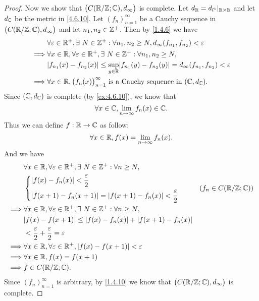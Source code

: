 \begin{proof}
  Now we show that \(\big(C(\mathbb{R} / \mathbb{Z} ; \mathbb{C}), d_\infty\big)\) is complete.
  Let \(d_{\mathbb{R}} = d_{l^1}|_{\mathbb{R} \times \mathbb{R}}\) and let \(d_{\mathbb{C}}\) be the metric in \cref{4.6.10}.
  Let \((f_n)_{n = 1}^\infty\) be a Cauchy sequence in \(\big(C(\mathbb{R} / \mathbb{Z} ; \mathbb{C}), d_\infty\big)\) and let \(n_1, n_2 \in \mathbb{Z}^+\).
  Then by \cref{1.4.6} we have
  \begin{align*}
             & \forall \varepsilon \in \R^+, \exists\ N \in \Z^+ : \forall n_1, n_2 \geq N, d_\infty(f_{n_1}, f_{n_2}) < \varepsilon       \\
    \implies & \forall x \in \R, \forall \varepsilon \in \R^+, \exists\ N \in \Z^+ : \forall n_1, n_2 \geq N,                              \\
             & \abs{f_{n_1}(x) - f_{n_2}(x)} \leq \sup_{y \in \R} \abs{f_{n_1}(y) - f_{n_2}(y)} = d_\infty(f_{n_1}, f_{n_2}) < \varepsilon \\
    \implies & \forall x \in \R, \big(f_n(x)\big)_{n = 1}^\infty \text{ is a Cauchy sequence in } (\C, d_{\C}).
  \end{align*}
  Since \((\mathbb{C}, d_{\mathbb{C}})\) is complete (by \cref{ex:4.6.10}), we know that
  \[
    \forall x \in \mathbb{C}, \lim_{n \to \infty} f_n(x) \in \mathbb{C}.
  \]
  Thus we can define \(f : \mathbb{R} \to \mathbb{C}\) as follow:
  \[
    \forall x \in \mathbb{R}, f(x) = \lim_{n \to \infty} f_n(x).
  \]
  And we have
  \begin{align*}
             & \forall x \in \R, \forall \varepsilon \in \R^+, \exists\ N \in \Z^+ : \forall n \geq N, \\
             & \begin{dcases}
                 \abs{f(x) - f_n(x)} < \dfrac{\varepsilon}{2} \\
                 \abs{f(x + 1) - f_n(x + 1)} = \abs{f(x + 1) - f_n(x)} < \dfrac{\varepsilon}{2}
               \end{dcases}          & (f_n \in C(\R / \Z ; \C))           \\
    \implies & \forall x \in \R, \forall \varepsilon \in \R^+, \exists\ N \in \Z^+ : \forall n \geq N, \\
             & \abs{f(x) - f(x + 1)} \leq \abs{f(x) - f_n(x)} + \abs{f(x + 1) - f_n(x)}                \\
             & < \dfrac{\varepsilon}{2} + \dfrac{\varepsilon}{2} = \varepsilon                         \\
    \implies & \forall x \in \R, \forall \varepsilon \in \R^+, \abs{f(x) - f(x + 1)} < \varepsilon     \\
    \implies & \forall x \in \R, f(x) = f(x + 1)                                                       \\
    \implies & f \in C(\R / \Z ; \C).
  \end{align*}
  Since \((f_n)_{n = 1}^\infty\) is arbitrary, by \cref{1.4.10} we know that \(\big(C(\mathbb{R} / \mathbb{Z} ; \mathbb{C}), d_\infty\big)\) is complete.
\end{proof}